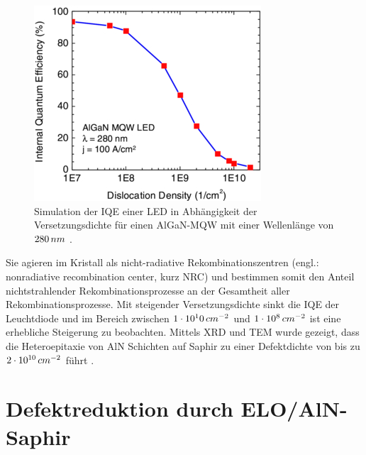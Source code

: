 %
\begin{figure}[h]
\centering
\begin{minipage}[t]{1\linewidth}
\centering
\includegraphics[width=0.5\linewidth]{Bilder/IQEthreadingdisl.PNG}
\end{minipage}%
\caption{Simulation der IQE einer LED in Abhängigkeit der Versetzungsdichte für einen AlGaN-MQW mit einer Wellenlänge von $280 \thinspace nm$ \cite{0268-1242-26-1-014036}.}
 \label{fig:IQEthreadingdisl}
\end{figure}
\noindent
%
Sie agieren im Kristall als nicht-radiative Rekombinationszentren (engl.: nonradiative recombination center, kurz NRC) und bestimmen somit den Anteil nichtstrahlender Rekombinationsprozesse an der Gesamtheit aller Rekombinationsprozesse. Mit steigender Versetzungsdichte sinkt die IQE der Leuchtdiode und im Bereich zwischen $1\cdot 10^10 \thinspace cm^{-2}$ und $1\cdot 10^8 \thinspace cm^{-2}$ ist eine erhebliche Steigerung zu beobachten. Mittels XRD und TEM wurde gezeigt, dass die Heteroepitaxie von AlN Schichten auf Saphir zu einer Defektdichte von bis zu $2\cdot 10^{10} \thinspace cm^{-2}$ führt \cite{zeimeru}.

\section{Defektreduktion durch ELO/AlN-Saphir}

